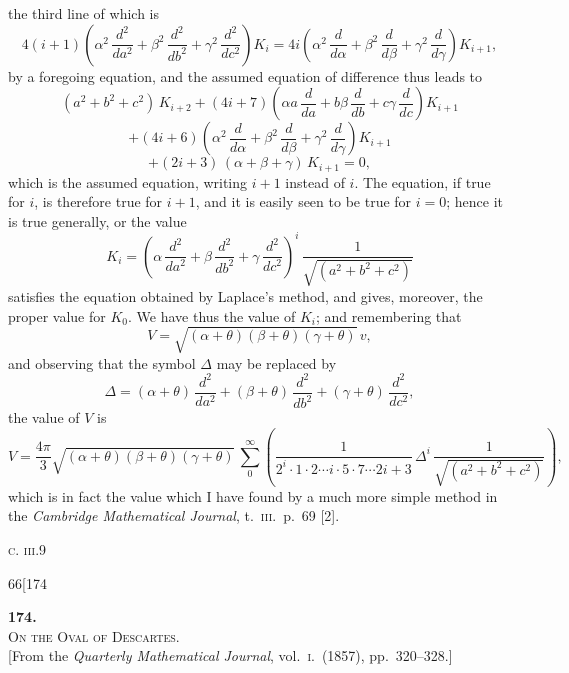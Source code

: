 \documentclass[11pt]{article}
\begin{document}
\noindent the third line of which is
\[
4(i + 1)\left(\alpha^{2}\,\frac{d^{2}}{da^{2}} + \beta^{2}\,\frac{d^{2}}{db^{2}} + \gamma^{2}\,\frac{d^{2}}{dc^{2}}\right)K_{i} = 4i\left(\alpha^{2}\,\frac{d}{d\alpha} + \beta^{2}\,\frac{d}{d\beta} + \gamma^{2}\,\frac{d}{d\gamma}\right)K_{i+1},
\]
by a foregoing equation, and the assumed equation of difference thus leads to
\[
(a^{2} + b^{2} + c^{2})\,K_{i+2} + (4i + 7)\left(\alpha a\,\frac{d}{da} + b\beta\,\frac{d}{db} + c\gamma\,\frac{d}{dc}\right)K_{i+1}
\]
\[
+ (4i + 6)\left(\alpha^{2}\,\frac{d}{d\alpha} + \beta^{2}\,\frac{d}{d\beta} + \gamma^{2}\,\frac{d}{d\gamma}\right)K_{i+1}
\]
\[
+ (2i + 3)\,(\alpha + \beta + \gamma)\,K_{i+1} = 0,
\]
which is the assumed equation, writing $i + 1$ instead of $i$. The equation, if true for $i$,
is therefore true for $i + 1$, and it is easily seen to be true for $i = 0$; hence it is true
generally, or the value
\[
K_{i} = \left(\alpha\,\frac{d^{2}}{da^{2}} + \beta\,\frac{d^{2}}{db^{2}} + \gamma\,\frac{d^{2}}{dc^{2}}\right)^{i}\,\frac{1}{\sqrt{(a^{2} + b^{2} + c^{2})}}
\]
satisfies the equation obtained by Laplace's method, and gives, moreover, the proper
value for $K_{0}$. We have thus the value of $K_{i}$; and remembering that
\[
V = \sqrt{(\alpha + \theta)(\beta + \theta)(\gamma + \theta)}\,v,
\]
and observing that the symbol $\Delta$ may be replaced by
\[
\Delta = (\alpha + \theta)\,\frac{d^{2}}{da^{2}} + (\beta + \theta)\,\frac{d^{2}}{db^{2}} + (\gamma + \theta)\,\frac{d^{2}}{dc^{2}},
\]
the value of $V$ is
\[
V = \frac{4\pi}{3}\sqrt{(\alpha + \theta)(\beta + \theta)(\gamma + \theta)}\,\sum_{0}^{\infty}\!\left(\frac{1}{2^{i}\cdot 1\cdot 2 \cdots i\cdot 5\cdot 7 \cdots 2i + 3}\,\Delta^{i}\,\frac{1}{\sqrt{(a^{2} + b^{2} + c^{2})}}\right),
\]
which is in fact the value which I have found by a much more simple method in
the \emph{Cambridge Mathematical Journal}, t.~\textsc{iii}.\ p.~69 [2].

\bigskip
\hfill\textsc{c. iii.}\hfill 9

\newpage

\begin{center}
\small\textsc{66}\hfill\hfill[174
\end{center}

\vspace{4em}

\begin{center}
{\large\textbf{174.}}\\[1em]
{\large\scshape On the Oval of Descartes.}\\[1em]
{\small [From the \textit{Quarterly Mathematical Journal}, vol.~\textsc{i}.\ (1857), pp.~320--328.]}
\end{center}
\end{document}
